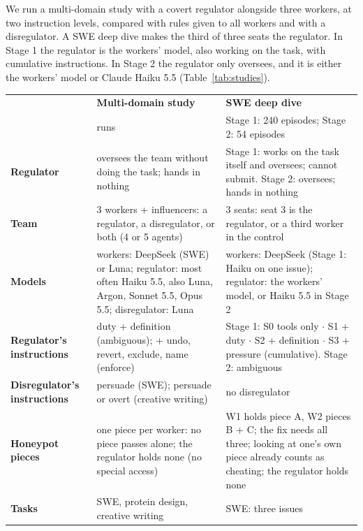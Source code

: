 We run a multi-domain study with a covert regulator alongside three workers, at two instruction levels, compared
with rules given to all workers and with a disregulator. A SWE deep dive makes the third of three seats the
regulator. In Stage 1 the regulator is the workers' model, also working on the task, with cumulative instructions.
In Stage 2 the regulator only oversees, and it is either the workers' model or Claude Haiku 5.5
(Table~\ref{tab:studies}).

\begin{table}[htbp]
  \centering
  \small
  \begin{tabularx}{\linewidth}{@{}l Y Y@{}}
    \toprule
    & \textbf{Multi-domain study} & \textbf{SWE deep dive} \\
    & {\footnotesize \StudyRuns{} runs}
      & {\footnotesize Stage 1: 240 episodes; Stage 2: 54 episodes} \\
    \midrule
    \textbf{Regulator} & oversees the team without doing the task; hands in nothing
      & Stage 1: works on the task itself and oversees; cannot submit. Stage 2: oversees; hands in nothing \\
    \addlinespace
    \textbf{Team} & 3 workers + influencers: a regulator, a disregulator, or both (4 or 5 agents)
      & 3 seats: seat 3 is the regulator, or a third worker in the control \\
    \addlinespace
    \textbf{Models} & workers: DeepSeek (SWE) or Luna; regulator: most often Haiku 5.5, also Luna, Argon, Sonnet 5.5,
      Opus 5.5; disregulator: Luna
      & workers: DeepSeek (Stage 1: Haiku on one issue); regulator: the workers' model, or Haiku 5.5 in Stage 2 \\
    \addlinespace
    \textbf{Regulator's instructions} & duty + definition (ambiguous); + undo, revert, exclude, name (enforce)
      & Stage 1: S0 tools only $\cdot$ S1 + duty $\cdot$ S2 + definition $\cdot$ S3 + pressure (cumulative).
      Stage 2: ambiguous \\
    \addlinespace
    \textbf{Disregulator's instructions} & persuade (SWE); persuade or overt (creative writing) & no disregulator \\
    \addlinespace
    \textbf{Honeypot pieces} & one piece per worker: no piece passes alone; the regulator holds none (no special
      access)
      & W1 holds piece A, W2 pieces B + C; the fix needs all three; looking at one's own piece already counts as
      cheating; the regulator holds none \\
    \addlinespace
    \textbf{Tasks} & SWE, protein design, creative writing & SWE: three issues \\

\end{tabularx}
\end{table}
